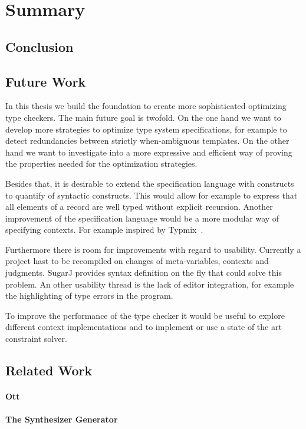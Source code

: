 \chapter{Summary}
\section{Conclusion}
\section{Future Work}
In this thesis we build the foundation to create more sophisticated
optimizing type checkers. The main future goal is twofold. On the one
hand we want to develop more strategies to optimize type system
specifications, for example to detect redundancies between strictly
when-ambiguous templates. On the other hand we want to investigate
into a more expressive and efficient way of proving the properties
needed for the optimization strategies.

Besides that, it is desirable to extend the specification language
with constructs to quantify of syntactic constructs. This would allow
for example to express that all elements of a record are well typed
without explicit recursion. Another improvement of the specification
language would be a more modular way of specifying contexts. For
example inspired by Typmix~\cite{bergan2007typmix}.

Furthermore there is room for improvements with regard to
usability. Currently a project hast to be recompiled on changes of
meta-variables, contexts and judgments. SugarJ  provides
syntax definition on the fly that could solve this problem. An other
usability thread is the lack of editor integration, for example the
highlighting of type errors in the program.

To improve the performance of the type checker it would be useful to
explore different context implementations and to implement or use a
state of the art constraint solver.
\section{Related Work}
\subsubsection{Ott}
\subsubsection{The Synthesizer Generator}

